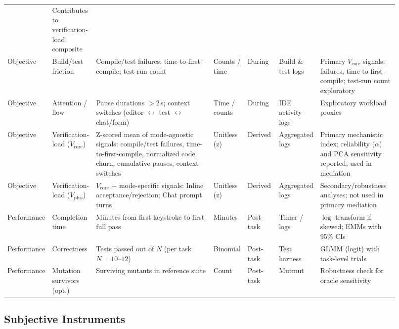 \documentclass[sigconf]{acmart}
\begin{document}
\begin{table}[h!]
{\begin{tabular}{p{0.08\linewidth} p{0.08\linewidth} p{0.30\linewidth} p{0.08\linewidth} p{0.08\linewidth} p{0.10\linewidth} p{0.2\linewidth}}
      & Contributes to verification-load composite \\
    Objective 
      & Build/test friction 
      & Compile/test failures; time-to-first-compile; test-run count 
      & Counts / time 
      & During 
     & Build \& test logs & Primary $V_{\text{core}}$ signals: failures, time-to-first-compile; test-run count exploratory \\
    Objective 
      & Attention / flow 
      & Pause durations $>$2\,s; context switches (editor $\leftrightarrow$ test $\leftrightarrow$ chat/form) 
      & Time / counts 
      & During 
      & IDE activity logs 
      & Exploratory workload proxies \\
    Objective 
      & Verification-load ($V_{\text{core}}$) 
      & Z-scored mean of mode-agnostic signals: compile/test failures, time-to-first-compile, normalized code churn, cumulative pauses, context switches 
      & Unitless (z) 
      & Derived 
      & Aggregated logs 
      & Primary mechanistic index; reliability ($\alpha$) and PCA sensitivity reported; used in mediation \\
    Objective 
      & Verification-load ($V_{\text{plus}}$) 
      & $V_{\text{core}}$ $+$ mode-specific signals: Inline acceptance/rejection; Chat prompt turns 
      & Unitless (z) 
      & Derived 
      & Aggregated logs 
      & Secondary/robustness analyses; not used in primary mediation \\
    \midrule
    Performance 
      & Completion time 
      & Minutes from first keystroke to first full pass 
      & Minutes 
      & Post-task 
      & Timer / logs 
      & $\log$-transform if skewed; EMMs with 95\% CIs \\
    Performance 
      & Correctness 
      & Tests passed out of $N$ (per task $N=10$--$12$) 
      & Binomial 
      & Post-task 
      & Test harness 
      & GLMM (logit) with task-level trials \\
    Performance 
      & Mutation survivors (opt.) 
      & Surviving mutants in reference suite 
      & Count 
      & Post-task 
      & Mutmut 
      & Robustness check for oracle sensitivity \\
    \bottomrule
  \end{tabular}
  }
\end{table}

\subsection{Subjective Instruments}
\end{document}
